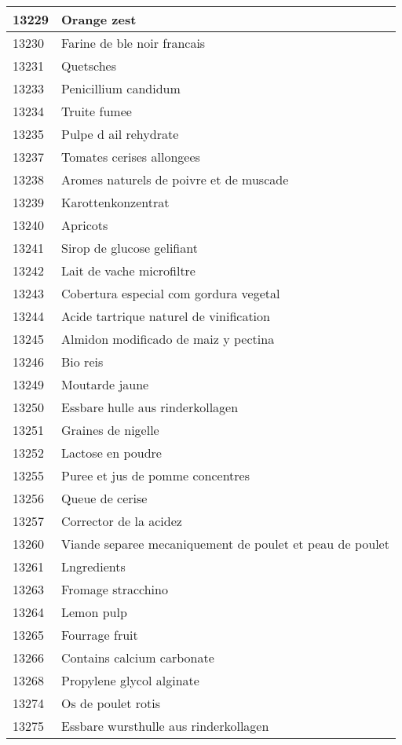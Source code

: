 \begin{longtable}{|l|l|}
13229 & Orange zest \\ \hline 
13230 & Farine de ble noir francais \\ \hline 
13231 & Quetsches \\ \hline 
13233 & Penicillium candidum \\ \hline 
13234 & Truite fumee \\ \hline 
13235 & Pulpe d ail rehydrate \\ \hline 
13237 & Tomates cerises allongees \\ \hline 
13238 & Aromes naturels de poivre et de muscade \\ \hline 
13239 & Karottenkonzentrat \\ \hline 
13240 & Apricots \\ \hline 
13241 & Sirop de glucose gelifiant \\ \hline 
13242 & Lait de vache microfiltre \\ \hline 
13243 & Cobertura especial com gordura vegetal \\ \hline 
13244 & Acide tartrique naturel de vinification \\ \hline 
13245 & Almidon modificado de maiz y pectina \\ \hline 
13246 & Bio reis \\ \hline 
13249 & Moutarde jaune \\ \hline 
13250 & Essbare hulle aus rinderkollagen \\ \hline 
13251 & Graines de nigelle \\ \hline 
13252 & Lactose en poudre \\ \hline 
13255 & Puree et jus de pomme concentres \\ \hline 
13256 & Queue de cerise \\ \hline 
13257 & Corrector de la acidez \\ \hline 
13260 & Viande separee mecaniquement de poulet et peau de poulet \\ \hline 
13261 & Lngredients \\ \hline 
13263 & Fromage stracchino \\ \hline 
13264 & Lemon pulp \\ \hline 
13265 & Fourrage fruit \\ \hline 
13266 & Contains calcium carbonate \\ \hline 
13268 & Propylene glycol alginate \\ \hline 
13274 & Os de poulet rotis \\ \hline 
13275 & Essbare wursthulle aus rinderkollagen \\ \hline 

\end{longtable}
